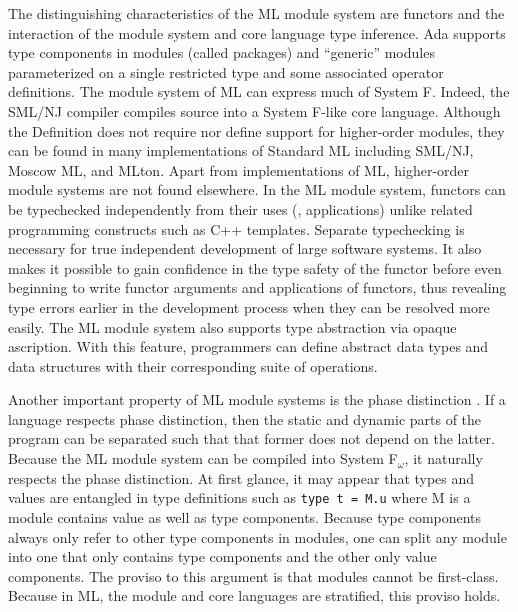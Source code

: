 \documentclass[12pt]{article}
\begin{document}
The distinguishing characteristics of the ML module system are functors and the interaction of the module system and core language type inference. Ada supports type components in modules (called packages) and ``generic'' modules parameterized on a single restricted type and some associated operator definitions. The module system of ML can express much of System F. Indeed, the SML/NJ compiler compiles source into a System F-like core language. Although the Definition\cite{mthm97} does not require nor define support for higher-order modules, they can be found in many implementations of Standard ML including SML/NJ, Moscow ML, and MLton. Apart from implementations of ML, higher-order module systems are not found elsewhere. In the ML module system, functors can be typechecked independently from their uses (\ie, applications) unlike related programming constructs such as C++ templates. Separate typechecking is necessary for true independent development of large software systems. It also makes it possible to gain confidence in the type safety of the functor before even beginning to write functor arguments and applications of functors, thus revealing type errors earlier in the development process when they can be resolved more easily. The ML module system also supports type abstraction via opaque ascription. With this feature, programmers can define abstract data types and data structures with their corresponding suite of operations. 

Another important property of ML module systems is the phase distinction \cite{hmm:phasedist}. If a language respects phase distinction, then the static and dynamic parts of the program can be separated such that that former does not depend on the latter. Because the ML module system can be compiled into System F$_\omega$, it naturally respects the phase distinction. At first glance, it may appear that types and values are entangled in type definitions such as \lstinline{type t = M.u} where M is a module contains value as well as type components. Because type components always only refer to other type components in modules, one can split any module into one that only contains type components and the other only value components. The proviso to this argument is that modules cannot be first-class. Because in ML, the module and core languages are stratified, this proviso holds. 
   
\end{document}
